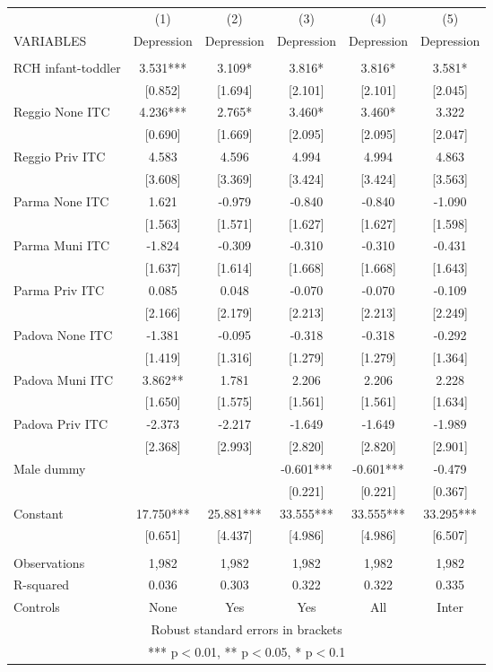 \begin{tabular}{lccccc} \hline
 & (1) & (2) & (3) & (4) & (5) \\
VARIABLES & Depression & Depression & Depression & Depression & Depression \\ \hline
 &  &  &  &  &  \\
RCH infant-toddler & 3.531*** & 3.109* & 3.816* & 3.816* & 3.581* \\
 & [0.852] & [1.694] & [2.101] & [2.101] & [2.045] \\
Reggio None ITC & 4.236*** & 2.765* & 3.460* & 3.460* & 3.322 \\
 & [0.690] & [1.669] & [2.095] & [2.095] & [2.047] \\
Reggio Priv ITC & 4.583 & 4.596 & 4.994 & 4.994 & 4.863 \\
 & [3.608] & [3.369] & [3.424] & [3.424] & [3.563] \\
Parma None ITC & 1.621 & -0.979 & -0.840 & -0.840 & -1.090 \\
 & [1.563] & [1.571] & [1.627] & [1.627] & [1.598] \\
Parma Muni ITC & -1.824 & -0.309 & -0.310 & -0.310 & -0.431 \\
 & [1.637] & [1.614] & [1.668] & [1.668] & [1.643] \\
Parma Priv ITC & 0.085 & 0.048 & -0.070 & -0.070 & -0.109 \\
 & [2.166] & [2.179] & [2.213] & [2.213] & [2.249] \\
Padova None ITC & -1.381 & -0.095 & -0.318 & -0.318 & -0.292 \\
 & [1.419] & [1.316] & [1.279] & [1.279] & [1.364] \\
Padova Muni ITC & 3.862** & 1.781 & 2.206 & 2.206 & 2.228 \\
 & [1.650] & [1.575] & [1.561] & [1.561] & [1.634] \\
Padova Priv ITC & -2.373 & -2.217 & -1.649 & -1.649 & -1.989 \\
 & [2.368] & [2.993] & [2.820] & [2.820] & [2.901] \\
Male dummy &  &  & -0.601*** & -0.601*** & -0.479 \\
 &  &  & [0.221] & [0.221] & [0.367] \\
Constant & 17.750*** & 25.881*** & 33.555*** & 33.555*** & 33.295*** \\
 & [0.651] & [4.437] & [4.986] & [4.986] & [6.507] \\
 &  &  &  &  &  \\
Observations & 1,982 & 1,982 & 1,982 & 1,982 & 1,982 \\
R-squared & 0.036 & 0.303 & 0.322 & 0.322 & 0.335 \\
 Controls & None & Yes & Yes & All & Inter \\ \hline
\multicolumn{6}{c}{ Robust standard errors in brackets} \\
\multicolumn{6}{c}{ *** p$<$0.01, ** p$<$0.05, * p$<$0.1} \\
\end{tabular}
